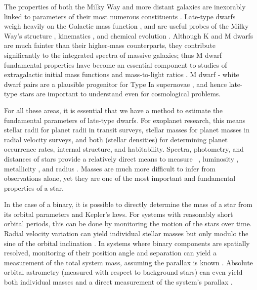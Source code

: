 \documentclass[twocolumn]{aastex62}
\begin{document}
The properties of both the Milky Way and more distant galaxies are inexorably linked to parameters of their most numerous constituents \citep[$>$70\% of stars in the Solar neighborhood are M dwarfs,][]{Henry:1994fk,Reid:2004lr}. Late-type dwarfs weigh heavily on the Galactic mass function \citep[e.g.,][]{Covey:2008lr}, and are useful probes of the Milky Way's structure \citep[e.g.,][]{2008ApJ...673..864J,2017ApJ...843..141F}, kinematics \citep[e.g.,][]{2007AJ....134.2418B,2015RAA....15..860Y}, and chemical evolution \citep{Woolf:2012lr,2015AJ....149..140H}. Although K and M dwarfs are much fainter than their higher-mass counterparts, they contribute significantly to the integrated spectra of massive galaxies; thus M dwarf fundamental properties have become an essential component to studies of extragalactic initial mass functions \citep[e.g.,][]{2012ApJ...747...69C,2016ApJ...821...39M} and mass-to-light ratios \citep{2015MNRAS.452L..21S}. M dwarf - white dwarf pairs are a plausible progenitor for Type Ia supernovae \citep{2012ApJ...758..123W}, and hence late-type stars are important to understand even for cosmological problems.

For all these areas, it is essential that we have a method to estimate the fundamental parameters of late-type dwarfs. For exoplanet research, this means stellar radii for planet radii in transit surveys, stellar masses for planet masses in radial velocity surveys, and both (stellar densities) for determining planet occurrence rates, internal structure, and habitability. Spectra, photometry, and distances of stars provide a relatively direct means to measure \teff\ \citep[e.g.,][]{Rojas-Ayala:2012uq,Mann2013c}, luminosity \citep[e.g.,][]{2002AJ....124.2721R}, metallicity \citep[e.g.,][]{2005A&A...442..635B,2010ApJ...720L.113R}, and radius \citep[e.g., via Stefan-Boltzmann, ][]{Newton2015A,2018arXiv180404133K}. Masses are much more difficult to infer from observations alone, yet they are one of the most important and fundamental properties of a star.  

In the case of a binary, it is possible to directly determine the mass of a star from its orbital parameters and Kepler's laws. For systems with reasonably short orbital periods, this can be done by monitoring the motion of the stars over time.  Radial velocity variation can yield individual stellar masses but only modulo the sine of the orbital inclination \citep[e.g.,][]{Torres2002,Kraus2011,2017arXiv171205046S}. In systems where binary components are spatially resolved, monitoring of their position angle and separation can yield a measurement of the total system mass, assuming the parallax is known \citep[e.g.,][]{Soderhjelm1999,Woi2003,2009ApJ...699..168D}. Absolute orbital astrometry (measured with respect to background stars) can even yield both individual masses and a direct measurement of the system's parallax \citep[e.g.,][]{Koh2012,Benedict2016}. 
\end{document}
